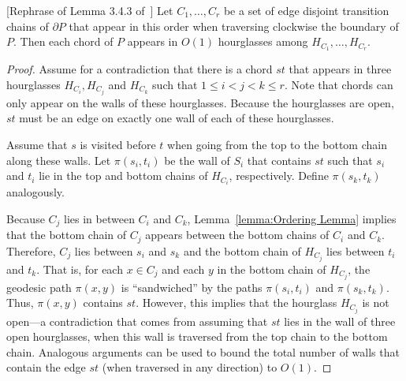 \documentclass[a4paper,UKenglish]{lipics}
\newcommand{\p}[2]{\ensuremath{\pi(#1, #2)}}
\begin{document}
\begin{lemma}\label{lemma:Edges appear a constant number of times}
[Rephrase of Lemma 3.4.3 of~\cite{aronov1993furthest}]
Let $C_1, \ldots, C_r$ be a set of edge disjoint transition chains of $\partial P$ that appear in this order when traversing clockwise the boundary of $P$. Then each chord of $P$ appears in $O(1)$ hourglasses among $H_{C_1}, \ldots, H_{C_r}$.
\end{lemma}
\begin{proof}
Assume for a contradiction that there is a chord $st$ that appears in three hourglasses $H_{C_i}, H_{C_j}$ and $H_{C_k}$ such that $1\leq i < j < k\leq r$. 
Note that chords can only appear on the walls of these hourglasses. Because the hourglasses are open, $st$ must be an edge on exactly one wall of each of these hourglasses. 

Assume that $s$ is visited before $t$ when going from the top to the bottom chain along these walls.
Let $\p{s_i}{t_i}$ be the wall of $S_i$ that contains $st$ such that $s_i$ and $t_i$ lie in the top and bottom chains of $H_{C_i}$, respectively. Define $\p{s_k}{t_k}$ analogously.

Because  $C_j$ lies in between $C_i$ and $C_k$, Lemma~\ref{lemma:Ordering Lemma} implies that the bottom chain of $C_j$ appears between the bottom chains of $C_i$ and $C_k$. Therefore, $C_j$ lies between $s_i$ and $s_k$ and the bottom chain of $H_{C_j}$ lies between $t_i$ and $t_k$. 
That is, for each $x\in C_j$ and each $y$ in the bottom chain of $H_{C_j}$, the geodesic path $\p{x}{y}$ is ``sandwiched'' by the paths $\p{s_i}{t_i}$ and $\p{s_k}{t_k}$.
Thus, $\p{x}{y}$ contains $st$.
However, this implies that the hourglass $H_{C_j}$ is not open---a contradiction that comes from assuming that $st$ lies in the  wall of three open hourglasses, when this wall is traversed from the top chain to the bottom chain. 
Analogous arguments can be used to bound the total number of walls that contain the edge $st$ (when traversed in any direction) to $O(1)$.
\end{proof}

\end{document}
